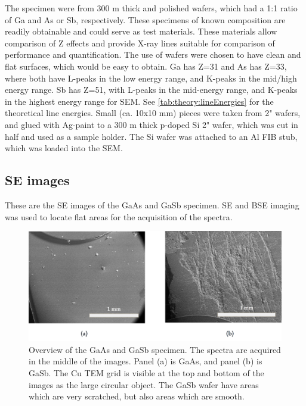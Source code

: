 The specimen were from 300 \textmu m thick and polished wafers, which had a 1:1 ratio of Ga and As or Sb, respectively.
These specimens of known composition are readily obtainable and could serve as test materials.
These materials allow comparison of Z effects and provide X-ray lines suitable for comparison of performance and quantification.
The use of wafers were chosen to have clean and flat surfaces, which would be easy to obtain.
Ga has Z=31 and As has Z=33, where both have L-peaks in the low energy range, and K-peaks in the mid/high energy range.
Sb has Z=51, with L-peaks in the mid-energy range, and K-peaks in the highest energy range for SEM.
See \cref{tab:theory:lineEnergies} for the theoretical line energies.
Small (ca. 10x10 mm) pieces were taken from 2" wafers, and glued with Ag-paint to a 300 \textmu m thick p-doped Si 2" wafer, which was cut in half and used as a sample holder.
The Si wafer was attached to an Al FIB stub, which was loaded into the SEM.




\subsection{SE images}
\label{method:SE_images}

These are the SE images of the GaAs and GaSb specimen.
SE and BSE imaging was used to locate flat areas for the acquisition of the spectra.

\begin{figure}[htbp]
    \centering
    \includegraphics[width=.95\textwidth]{figures/SE_images/Overview_GaAs_GaSb.jpg}
    \caption{
        Overview of the GaAs and GaSb specimen.
        The spectra are acquired in the middle of the images.
        Panel (a) is GaAs, and panel (b) is GaSb.
        The Cu TEM grid is visible at the top and bottom of the images as the large circular object.
        The GaSb wafer have areas which are very scratched, but also areas which are smooth.
    }
    \label{fig:SE_images:Overview_GaAs_GaSb}
\end{figure}

